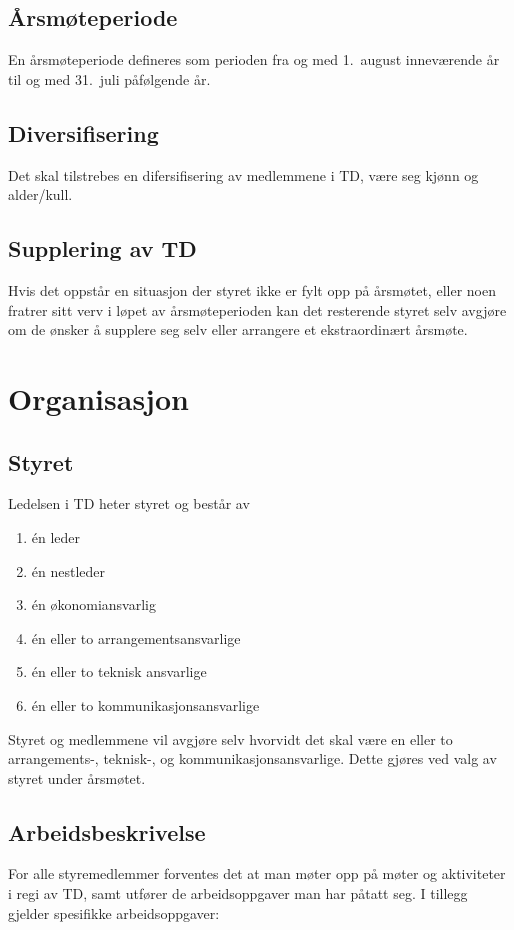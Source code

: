 \documentclass[11pt]{article}
\begin{document}
\subsection{Årsmøteperiode}
En årsmøteperiode defineres som perioden fra og med 1.\ august inneværende år til og med 31.\ juli påfølgende år.

\subsection{Diversifisering}
Det skal tilstrebes en difersifisering av medlemmene i TD, være seg kjønn og alder/kull.

\subsection{Supplering av TD}
Hvis det oppstår en situasjon der styret ikke er fylt opp på årsmøtet, eller noen fratrer sitt verv i løpet av årsmøteperioden kan det resterende styret selv avgjøre om de ønsker å supplere seg selv eller arrangere et ekstraordinært årsmøte.

\section{Organisasjon}
\subsection{Styret}
Ledelsen i TD heter styret og består av
\begin{enumerate}
	\item én leder
	\item én nestleder
	\item én økonomiansvarlig
	\item én eller to arrangementsansvarlige
	\item én eller to teknisk ansvarlige
	\item én eller to kommunikasjonsansvarlige 
\end{enumerate}

Styret og medlemmene vil avgjøre selv hvorvidt det skal være en eller to arrangements-, teknisk-, og kommunikasjonsansvarlige. Dette gjøres ved valg av styret under årsmøtet.

\subsection{Arbeidsbeskrivelse}
For alle styremedlemmer forventes det at man møter opp på møter og aktiviteter i regi av TD, samt utfører de arbeidsoppgaver man har påtatt seg. I tillegg gjelder spesifikke arbeidsoppgaver:
\end{document}
